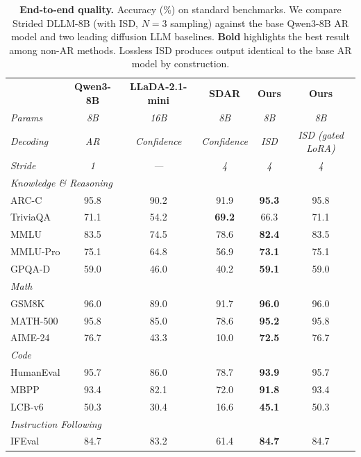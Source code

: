 \begin{table}[t]
\centering
\caption{\textbf{End-to-end quality.} Accuracy (\%) on standard benchmarks. We compare Strided DLLM-8B (with ISD, $N{=}3$ sampling) against the base Qwen3-8B AR model and two leading diffusion LLM baselines. \textbf{Bold} highlights the best result among non-AR methods. Lossless ISD produces output identical to the base AR model by construction.}
\label{tab:main_results}
\scriptsize
\setlength{\tabcolsep}{3pt}
\begin{tabular}{lccccc}
\toprule
& \textbf{Qwen3-8B} & \textbf{LLaDA-2.1-mini} & \textbf{SDAR} & \textbf{Ours} & \textbf{Ours} \\
\textit{Params} & \textit{8B} & \textit{16B} & \textit{8B} & \textit{8B} & \textit{8B} \\
\textit{Decoding} & \textit{AR} & \textit{Confidence} & \textit{Confidence} & \textit{ISD} & \textit{ISD (gated LoRA)} \\
\textit{Stride} & \textit{1} & \textit{---} & \textit{4} & \textit{4} & \textit{4} \\
\midrule
\multicolumn{5}{l}{\textit{Knowledge \& Reasoning}} \\
ARC-C & 95.8 & 90.2 & 91.9 & \textbf{95.3} & 95.8 \\
TriviaQA & 71.1 & 54.2 & \textbf{69.2} & 66.3 & 71.1 \\
MMLU & 83.5 & 74.5 & 78.6 & \textbf{82.4} & 83.5 \\
MMLU-Pro & 75.1 & 64.8 & 56.9 & \textbf{73.1} & 75.1 \\
GPQA-D & 59.0 & 46.0 & 40.2 & \textbf{59.1} & 59.0 \\
\midrule
\multicolumn{5}{l}{\textit{Math}} \\
GSM8K & 96.0 & 89.0 & 91.7 & \textbf{96.0} & 96.0 \\
MATH-500 & 95.8 & 85.0 & 78.6 & \textbf{95.2} & 95.8 \\
AIME-24 & 76.7 & 43.3 & 10.0 & \textbf{72.5} & 76.7 \\
\midrule
\multicolumn{5}{l}{\textit{Code}} \\
HumanEval & 95.7 & 86.0 & 78.7 & \textbf{93.9} & 95.7 \\
MBPP & 93.4 & 82.1 & 72.0 & \textbf{91.8} & 93.4 \\
LCB-v6 & 50.3 & 30.4 & 16.6 & \textbf{45.1} & 50.3 \\
\midrule
\multicolumn{5}{l}{\textit{Instruction Following}} \\
IFEval & 84.7 & 83.2 & 61.4 & \textbf{84.7} & 84.7 \\
\bottomrule
\end{tabular}
\end{table}

